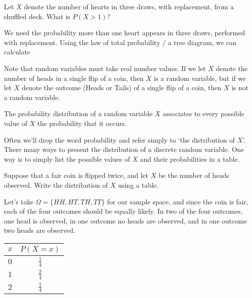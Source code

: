\begin{examp} Let $X$ denote the number of hearts in three draws, with replacement, from a shuffled deck. What is $P(X > 1)$?
\par
\noindent We need the probability more than one heart appears in three draws, performed with replacement. Using the law of total probability / a tree diagram, we can calculate
\end{examp}
\par

\begin{rmk} Note that random variables must take real number values. If we let $X$ denote the number of heads in a single flip of a coin, then $X$ is a random variable, but if we let $X$ denote the outcome (Heads or Tails) of a single flip of a coin, then $X$ is not a random variable.
\end{rmk}

\begin{defn}
The probability distribution of a random variable $X$ associates to every possible value of $X$ the probability that it occurs.
\end{defn}

Often we'll drop the word probability and refer simply to `the distribution of $X$'. There many ways to present the distribution of a discrete random variable. One way is to simply list the possible values of $X$ and their probabilities in a table.

\begin{examp} Suppose that a fair coin is flipped twice, and let $X$ be the number of heads observed. Write the distribution of $X$ using a table.
\par
\noindent
Let's take $\Omega = \{HH, HT, TH, TT\}$ for our sample space, and since the coin is fair, each of the four outcomes should be equally likely. In two of the four outcomes, one head is observed, in one outcome no heads are observed, and in one outcome two heads are observed.
\renewcommand*{\arraystretch}{1.35}
\begin{center}
\begin{tabular}{c|c}
$x$ & $P(X = x)$ \\
\hline
$0$ & $\frac{1}{4}$ \\
$1$ & $\frac{2}{4}$ \\
$2$ & $\frac{1}{4}$ \\
\end{tabular}
\end{center}
\renewcommand*{\arraystretch}{1}
\end{examp}

